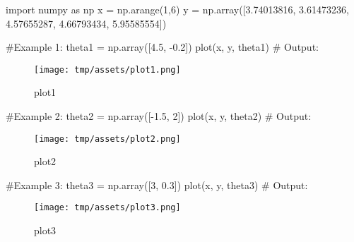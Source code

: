 \documentclass[]{article}
\newenvironment{Shaded}{\begin{snugshade}}{\end{snugshade}}
\newcommand{\CommentTok}[1]{\textcolor[rgb]{0.48,0.49,0.49}{#1}}
\newcommand{\DecValTok}[1]{\textcolor[rgb]{0.96,0.45,0.00}{#1}}
\newcommand{\FloatTok}[1]{\textcolor[rgb]{0.96,0.45,0.00}{#1}}
\newcommand{\ImportTok}[1]{\textcolor[rgb]{0.15,0.68,0.38}{#1}}
\newcommand{\NormalTok}[1]{\textcolor[rgb]{0.81,0.81,0.76}{#1}}
\newcommand{\OperatorTok}[1]{\textcolor[rgb]{0.81,0.81,0.76}{#1}}
\begin{document}
\begin{Shaded}
\begin{Highlighting}[]
\ImportTok{import}\NormalTok{ numpy }\ImportTok{as}\NormalTok{ np}
\NormalTok{x }\OperatorTok{=}\NormalTok{ np.arange(}\DecValTok{1}\NormalTok{,}\DecValTok{6}\NormalTok{)}
\NormalTok{y }\OperatorTok{=}\NormalTok{ np.array([}\FloatTok{3.74013816}\NormalTok{, }\FloatTok{3.61473236}\NormalTok{, }\FloatTok{4.57655287}\NormalTok{, }\FloatTok{4.66793434}\NormalTok{, }\FloatTok{5.95585554}\NormalTok{])}

\CommentTok{#Example 1:}
\NormalTok{theta1 }\OperatorTok{=}\NormalTok{ np.array([}\FloatTok{4.5}\NormalTok{, }\FloatTok{-0.2}\NormalTok{])}
\NormalTok{plot(x, y, theta1)}
\CommentTok{# Output:}
\end{Highlighting}
\end{Shaded}

\begin{figure}
\centering
\texttt{[image: tmp/assets/plot1.png]}
\caption{plot1}
\end{figure}

\begin{Shaded}
\begin{Highlighting}[]
\CommentTok{#Example 2:}
\NormalTok{theta2 }\OperatorTok{=}\NormalTok{ np.array([}\OperatorTok{-}\FloatTok{1.5}\NormalTok{, }\DecValTok{2}\NormalTok{])}
\NormalTok{plot(x, y, theta2)}
\CommentTok{# Output:}
\end{Highlighting}
\end{Shaded}

\begin{figure}
\centering
\texttt{[image: tmp/assets/plot2.png]}
\caption{plot2}
\end{figure}

\newpage

\begin{Shaded}
\begin{Highlighting}[]
\CommentTok{#Example 3:}
\NormalTok{theta3 }\OperatorTok{=}\NormalTok{ np.array([}\DecValTok{3}\NormalTok{, }\FloatTok{0.3}\NormalTok{])}
\NormalTok{plot(x, y, theta3)}
\CommentTok{# Output:}
\end{Highlighting}
\end{Shaded}

\begin{figure}
\centering
\texttt{[image: tmp/assets/plot3.png]}
\caption{plot3}
\end{figure}
\end{document}
